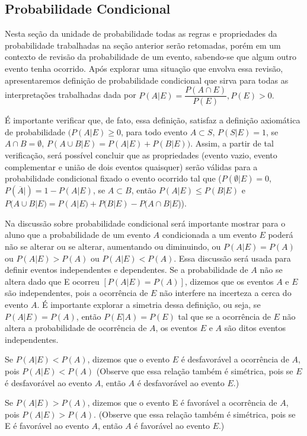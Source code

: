 \clearpage
\begin{paginatexto}
\section{Probabilidade Condicional}

Nesta seção da unidade de probabilidade todas as regras e propriedades da probabilidade trabalhadas na seção anterior serão retomadas, porém em um contexto de revisão da probabilidade de um evento, sabendo-se que algum outro evento tenha ocorrido. Após explorar uma situação que envolva essa revisão, apresentaremos definição de probabilidade condicional que sirva para todas as interpretações trabalhadas dada por $P(A|E)=\dfrac{P(A\cap E)}{P(E)},  P(E)>0.$

É importante verificar que, de fato, essa definição, satisfaz a definição axiomática de probabilidade $(P(A|E)\geq0$, para todo evento $A\subset S$, $P(S|E)=1$, se $A\cap B=\emptyset$, $P(A\cup B|E)=P(A|E)+P(B|E))$. Assim, a partir de tal verificação, será possível concluir que as propriedades (evento vazio, evento complementar e união de dois eventos quaisquer) serão válidas para a probabilidade condicional fixado o evento ocorrido tal que ($P(\emptyset|E)=0$, $P(\overline{A}|)=1−P(A|E)$, se $A\subset B$, então $P(A|E)\leq P(B|E)$ e $P(A\cup B|E)=P(A|E)+P(B|E)−P(A\cap B|E$)).

Na discussão sobre probabilidade condicional será importante mostrar para o aluno que a probabilidade de um evento $A$ condicionada a um evento $E$ poderá não se alterar ou se alterar, aumentando ou diminuindo, ou $P(A|E)=P(A)$ ou $P(A|E)>P(A)$ ou $P(A|E)<P(A)$. Essa discussão será usada para definir eventos independentes e dependentes. Se a probabilidade de $A$ não se altera dado que E ocorreu $[P(A|E)=P(A)]$, dizemos que os eventos $A$ e $E$ são independentes, pois a ocorrência de $E$ não interfere na incerteza a cerca do evento $A$. É importante explorar a simetria dessa definição, ou seja, se $P(A|E)=P(A)$, então $P(E|A)=P(E)$ tal que se a ocorrência de $E$ não altera a probabilidade de ocorrência de $A$, os eventos $E$ e $A$ são ditos eventos independentes.

Se $P(A|E)<P(A)$, dizemos que o evento $E$ é desfavorável a ocorrência de $A$, pois $P(A|E)<P(A)$ (Observe que essa relação também é simétrica, pois se $E$ é desfavorável ao evento $A$, então $A$ é desfavorável ao evento $E$.)

Se $P(A|E)>P(A)$, dizemos que o evento E é favorável a ocorrência de $A$, pois $P(A|E)>P(A)$. (Observe que essa relação também é simétrica, pois se E é favorável ao evento $A$, então $A$ é favorável ao evento $E$.)


\end{paginatexto}

